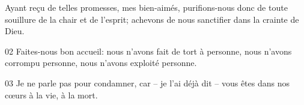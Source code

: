 Ayant reçu de telles promesses, mes bien-aimés, purifions-nous donc de toute souillure de la chair et de l’esprit; achevons de nous sanctifier dans la crainte de Dieu.

02 Faites-nous bon accueil: nous n’avons fait de tort à personne, nous n’avons corrompu personne, nous n’avons exploité personne.

03 Je ne parle pas pour condamner, car – je l’ai déjà dit – vous êtes dans nos cœurs à la vie, à la mort.
